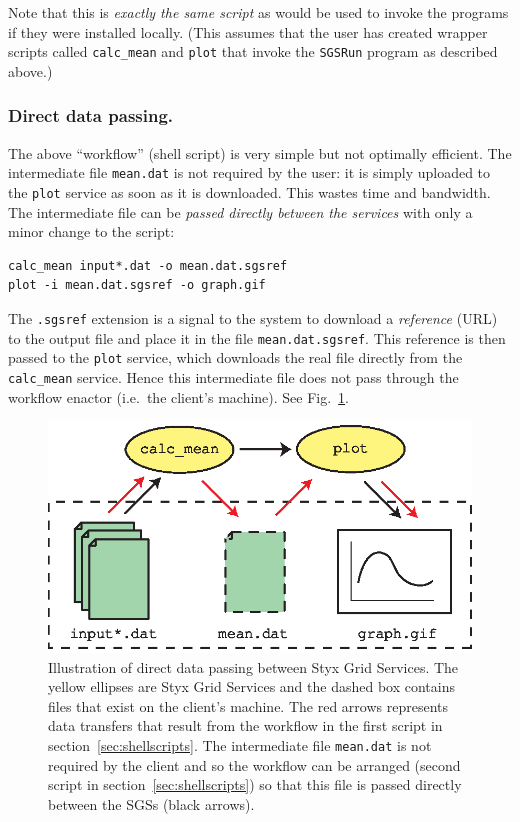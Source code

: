\documentclass{llncs}
\begin{document}
Note that this is {\em exactly the same script\/} as would be used to invoke the programs if they were installed locally.  (This assumes that the user has created wrapper scripts called {\tt calc\_mean} and {\tt plot} that invoke the {\tt SGSRun} program as described above.)

\subsubsection{Direct data passing.}\label{sec:datapassing}
The above ``workflow'' (shell script) is very simple but not optimally efficient.  The intermediate file {\tt mean.dat} is not required by the user: it is simply uploaded to the {\tt plot} service as soon as it is downloaded.  This wastes time and bandwidth.  The intermediate file can be {\em passed directly between the services\/} with only a minor change to the script:

\begin{verbatim}
calc_mean input*.dat -o mean.dat.sgsref
plot -i mean.dat.sgsref -o graph.gif
\end{verbatim}

The {\tt .sgsref} extension is a signal to the system to download a {\em reference\/} (URL) to the output file and place it in the file {\tt mean.dat.sgsref}.  This reference is then passed to the {\tt plot} service, which downloads the real file directly from the {\tt calc\_mean} service.  Hence this intermediate file does not pass through the workflow enactor (i.e.\ the client's machine).  See Fig.~\ref{fig:datapassing}.

\begin{figure}
\begin{center}
\includegraphics{datapassing.eps}
\end{center}
\caption{Illustration of direct data passing between Styx Grid Services.  The yellow ellipses are Styx Grid Services and the dashed box contains files that exist on the client's machine.  The red arrows represents data transfers that result from the workflow in the first script in section~\ref{sec:shellscripts}.  The intermediate file {\tt mean.dat} is not required by the client and so the workflow can be arranged (second script in section~\ref{sec:shellscripts}) so that this file is passed directly between the SGSs (black arrows).}\label{fig:datapassing}
\end{figure}
\end{document}
